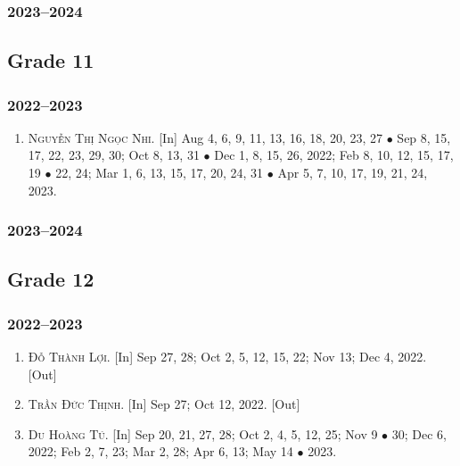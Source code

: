 \documentclass{article}
\begin{document}
\subsubsection{2023--2024}


\subsection{Grade 11}

\subsubsection{2022--2023}

\begin{enumerate}
	\item \textsc{Nguyễn Thị Ngọc Nhi.} \textsf{[In]} Aug 4, 6, 9, 11, 13, 16, 18, 20, 23, 27 $\bullet$ Sep 8, 15, 17, 22, 23, 29, 30; Oct 8, 13, 31 $\bullet$ Dec 1, 8,  15, 26, 2022; Feb 8, 10, 12, 15, 17, 19 $\bullet$ 22, 24; Mar 1, 6, 13, 15, 17, 20, 24, 31 $\bullet$ Apr 5, 7, 10, 17, 19, 21, 24, 2023.
\end{enumerate}

\subsubsection{2023--2024}


\subsection{Grade 12}

\subsubsection{2022--2023}

\begin{enumerate}
	\item \textsc{Đỗ Thành Lợi.} \textsf{[In]} Sep 27, 28; Oct 2, 5, 12, 15, 22; Nov 13; Dec 4, 2022. \textsf{[Out]}
	\item \textsc{Trần Đức Thịnh.} \textsf{[In]} Sep 27; Oct 12, 2022.  \textsf{[Out]}
	\item \textsc{Du Hoàng Tú.} \textsf{[In]} Sep 20, 21, 27, 28; Oct 2, 4, 5, 12, 25; Nov 9 $\bullet$ 30; Dec 6, 2022; Feb 2, 7, 23; Mar 2, 28; Apr 6, 13; May 14 $\bullet$ 2023.
\end{enumerate}
\end{document}
